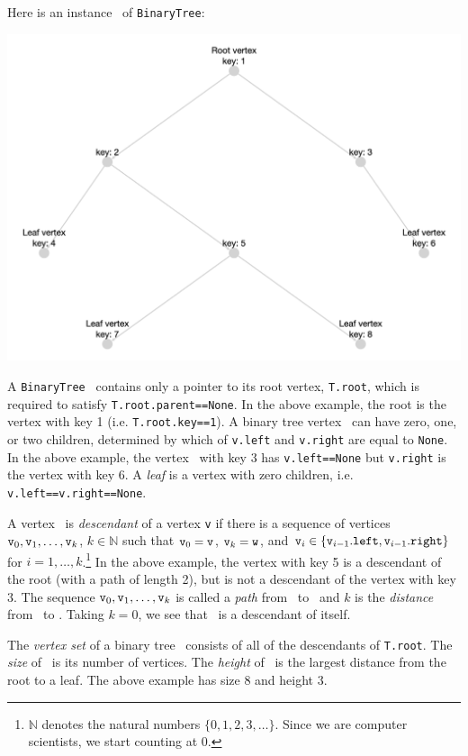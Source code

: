 \documentclass[11pt]{article}
\begin{document}
\begin{enumerate}
 Here is an instance \treeT\ of \texttt{BinaryTree}:
 
 \includegraphics[scale=.175]{ps0-assets/p0_q1_BT_before.png}

 A \texttt{BinaryTree} \treeT\  contains only a pointer to its root vertex, \texttt{T.root}, which is required to satisfy \texttt{T.root.parent==None}. In the above example, 
 the root is the vertex with key 1 (i.e. \texttt{T.root.key==1}).
 A binary tree vertex \btv\ can have zero, one, or two children, determined by which of \texttt{v.left} and  \texttt{v.right} are equal to \texttt{None}.    In the above example, the vertex \btv\ with key 3 has 
 \texttt{v.left==None} but \texttt{v.right} is the vertex with key 6.
 A {\em leaf} is a vertex with zero children, i.e. \texttt{v.left==v.right==None}. 
 
 A vertex \btw\ is {\em descendant} of a vertex \texttt{v} if there is a sequence of vertices $\texttt{v}_0,\texttt{v}_1,\ldots,\texttt{v}_k$, $k\in \mathbb{N}$ such that $\texttt{v}_0=\texttt{v}$, $\texttt{v}_k=\texttt{w}$, and 
 $\texttt{v}_i \in \{\texttt{v}_{i-1}.\texttt{left},\texttt{v}_{i-1}.\texttt{right}\}$ for $i=1,\ldots,k$.\footnote{$\mathbb{N}$ denotes the natural numbers $\{0,1,2,3,\ldots\}$.  Since we are computer scientists, we start counting at 0.}
 In the above example, the vertex with key 5 is a descendant of the root (with a path of length 2), but is not a descendant of the vertex with key 3.
 The sequence $\texttt{v}_0,\texttt{v}_1,\ldots,\texttt{v}_k$ is called a {\em path} from \btv\ to \btw\ and $k$ is the {\em distance} from \btv\ to \btw. Taking $k=0$, we see that \btv\ is a descendant of itself.

 The {\em vertex set} of a binary tree \treeT\ consists of all of the descendants of \texttt{T.root}. The {\em size} of \treeT\ is its number of vertices. 
 The {\em height} of \treeT\ is the largest distance from the root to a leaf.  The above example has size 8 and height 3.
 

\end{enumerate}
\end{document}
